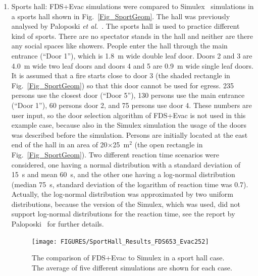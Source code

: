 \documentclass[12pt,a4paper,final,twoside]{stylevk}
\begin{document}
\begin{enumerate}
%
\item Sports hall: FDS+Evac simulations were compared to
  Simulex~\cite{Simulex96, Thompson95a, Thompson95b, Thompson03}
  simulations in a sports hall shown in Fig.~\ref{Fig_SportGeom}.
  The hall was previously analysed by Paloposki \emph{et
    al.}~\cite{Paloposki02}.  The sports hall is used to practice
  different kind of sports.  There are no spectator stands in the hall
  and neither are there any social spaces like showers.  People enter
  the hall through the main entrance (``Door 1''), which is 1.8~m wide
  double leaf door.  Doors 2 and 3 are 4.0~m wide two leaf doors and
  doors 4 and 5 are 0.9~m wide single leaf doors.  It is assumed that
  a fire starts close to door 3 (the shaded rectangle in
  Fig.~\ref{Fig_SportGeom}) so that this door cannot be used for
  egress.  235 persons use the closest door (``Door 5''), 130 persons
  use the main entrance (``Door 1''), 60 persons door 2, and 75
  persons use door 4.  These numbers are user input, so the door
  selection algorithm of FDS+Evac is not used in this example case,
  because also in the Simulex simulation the usage of the doors was
  described before the simulation.  Persons are initially located at
  the east end of the hall in an area of 20$\times$25~$\mathrm{m^2}$
  (the open rectangle in Fig.~\ref{Fig_SportGeom}).  Two different
  reaction time scenarios were considered, one having a normal
  distribution with a standard deviation of 15~s and mean 60~s, and
  the other one having a log-normal distribution (median 75~s,
  standard deviation of the logarithm of reaction time was 0.7).
  Actually, the log-normal distribution was approximated by two
  uniform distributions, because the version of the Simulex, which was
  used, did not support log-normal distributions for the reaction
  time, see the report by Paloposki~\cite{Paloposki02} for further
  details.

  \begin{figure}[!tb]
    \centerline{\texttt{[image: FIGURES/SportHall\_Results\_FDS653\_Evac252]}}
    \caption{The comparison of FDS+Evac to Simulex in a sport hall
      case.  The average of five different simulations are shown for
      each case.}\label{Fig_SportResults}
  \end{figure}


\end{enumerate}
\end{document}
